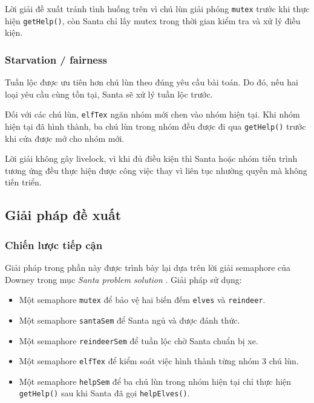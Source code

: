 Lời giải đề xuất tránh tình huống trên vì chú lùn giải phóng
\texttt{mutex} trước khi thực hiện \texttt{getHelp()}, còn Santa chỉ
lấy mutex trong thời gian kiểm tra và xử lý điều kiện.

\subsubsection*{Starvation / fairness}

Tuần lộc được ưu tiên hơn chú lùn theo đúng yêu cầu bài toán. Do đó, nếu
hai loại yêu cầu cùng tồn tại, Santa sẽ xử lý tuần lộc trước.

Đối với các chú lùn, \texttt{elfTex} ngăn nhóm mới chen vào nhóm hiện
tại. Khi nhóm hiện tại đã hình thành, ba chú lùn trong nhóm đều được đi
qua \texttt{getHelp()} trước khi cửa được mở cho nhóm mới.

Lời giải không gây livelock, vì khi đủ điều kiện thì Santa hoặc nhóm
tiến trình tương ứng đều thực hiện được công việc thay vì liên tục
nhường quyền mà không tiến triển.


\subsection{Giải pháp đề xuất}

\subsubsection*{Chiến lược tiếp cận}

Giải pháp trong phần này được trình bày lại dựa trên lời giải semaphore
của Downey trong mục \textit{Santa problem solution}
\cite[Sec.~5.5.2, pp.~141--142]{downey2016}. Giải pháp sử dụng:

\begin{itemize}
\item Một semaphore \texttt{mutex} để bảo vệ hai biến đếm
\texttt{elves} và \texttt{reindeer}.
\item Một semaphore \texttt{santaSem} để Santa ngủ và được đánh thức.
\item Một semaphore \texttt{reindeerSem} để tuần lộc chờ Santa chuẩn
bị xe.
\item Một semaphore \texttt{elfTex} để kiểm soát việc hình thành
từng nhóm 3 chú lùn.
\item Một semaphore \texttt{helpSem} để ba chú lùn trong nhóm hiện tại
chỉ thực hiện \texttt{getHelp()} sau khi Santa đã gọi
\texttt{helpElves()}.
\end{itemize}

